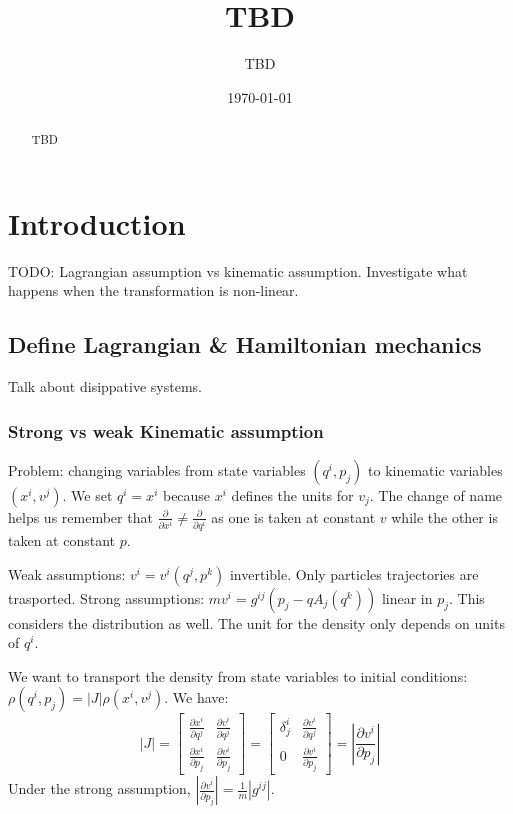 \documentclass[letterpaper]{article}
\begin{document}

\title{TBD}
\author{TBD}

\date{\today}

\maketitle

\begin{abstract}
	TBD
\end{abstract}


\section{Introduction}


TODO: Lagrangian assumption vs kinematic assumption. Investigate what happens when the transformation is non-linear.

\subsection{Define Lagrangian \& Hamiltonian mechanics}

Talk about disippative systems.

\subsubsection{Strong vs weak Kinematic assumption}

Problem: changing variables from state variables $(q^i, p_j)$ to kinematic variables $(x^i, v^j)$. We set $q^i=x^i$ because $x^i$ defines the units for $v_j$. The change of name helps us remember that $\frac{\partial}{\partial x^i} \neq \frac{\partial}{\partial q^i}$ as one is taken at constant $v$ while the other is taken at constant $p$.

Weak assumptions: $v^i = v^i(q^j, p^k)$ invertible. Only particles trajectories are trasported. Strong assumptions: $m v^i = g^{ij} (p_j - q A_j(q^k))$ linear in $p_j$. This considers the distribution as well. The unit for the density only depends on units of $q^i$.

We want to transport the density from state variables to initial conditions: $\rho(q^i, p_j) = |J| \rho(x^i, v^j)$. We have:
\begin{equation}
	|J| = \begin{bmatrix}
	\frac{\partial x^i}{\partial q^j} & \frac{\partial v^i}{\partial q^j} \\
	\frac{\partial x^i}{\partial p_j} & \frac{\partial v^i}{\partial p_j}
	\end{bmatrix}
	= \begin{bmatrix}
	\delta^i_j & \frac{\partial v^i}{\partial q^j} \\
	0 & \frac{\partial v^i}{\partial p_j}
	\end{bmatrix}
	= \left|\frac{\partial v^i}{\partial p_j}\right|
\end{equation}
Under the strong assumption, $\left|\frac{\partial v^i}{\partial p_j}\right| = \frac{1}{m} |g^{ij}|$.
\end{document}
